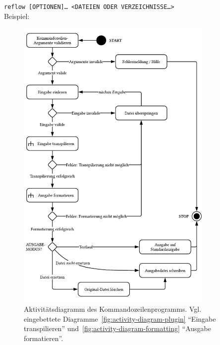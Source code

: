 {
  \small
  \texttt{reflow [OPTIONEN]… <DATEIEN ODER VERZEICHNISSE…>}\\
  Beispiel: 
}



\begin{figure}[tbp]
  \centering
  \includegraphics[width=0.85\textwidth]{src/4_Umsetzung/fig/activity-diagram-cli.pdf}
  \caption[Aktivitätsdiagramm des Kommandozeilenprogramms]{Aktivitätsdiagramm des Kommandozeilenprogramms. Vgl. eingebettete Diagramme~\ref{fig:activity-diagram-plugin} \enquote{Eingabe transpilieren} und~\ref{fig:activity-diagram-formatting} \enquote{Ausgabe formatieren}.}
  \label{fig:activity-diagram-cli}
\end{figure}

